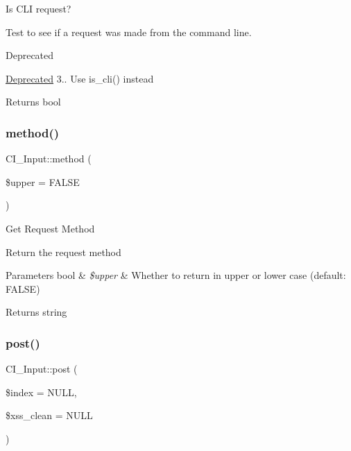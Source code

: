 Is C\+LI request?

Test to see if a request was made from the command line.

\begin{DoxyRefDesc}{Deprecated}
\item[\mbox{\hyperlink{deprecated__deprecated000002}{Deprecated}}]3.. Use is\+\_\+cli() instead \end{DoxyRefDesc}
\begin{DoxyReturn}{Returns}
bool 
\end{DoxyReturn}
\mbox{\label{class_c_i___input_abcb24e05b69096ac7b7b6e00a5c0d713}} 
\subsubsection{\texorpdfstring{method()}{method()}}
{\footnotesize\ttfamily C\+I\+\_\+\+Input\+::method (\begin{DoxyParamCaption}\item[{}]{\$upper = {\ttfamily FALSE} }\end{DoxyParamCaption})}

Get Request Method

Return the request method


\begin{DoxyParams}[1]{Parameters}
bool & {\em \$upper} & Whether to return in upper or lower case (default\+: F\+A\+L\+SE) \\
\hline
\end{DoxyParams}
\begin{DoxyReturn}{Returns}
string 
\end{DoxyReturn}
\mbox{\label{class_c_i___input_ae3472c7693aa86ca1591005bb7c59a00}} 
\subsubsection{\texorpdfstring{post()}{post()}}
{\footnotesize\ttfamily C\+I\+\_\+\+Input\+::post (\begin{DoxyParamCaption}\item[{}]{\$index = {\ttfamily NULL},  }\item[{}]{\$xss\+\_\+clean = {\ttfamily NULL} }\end{DoxyParamCaption})}

